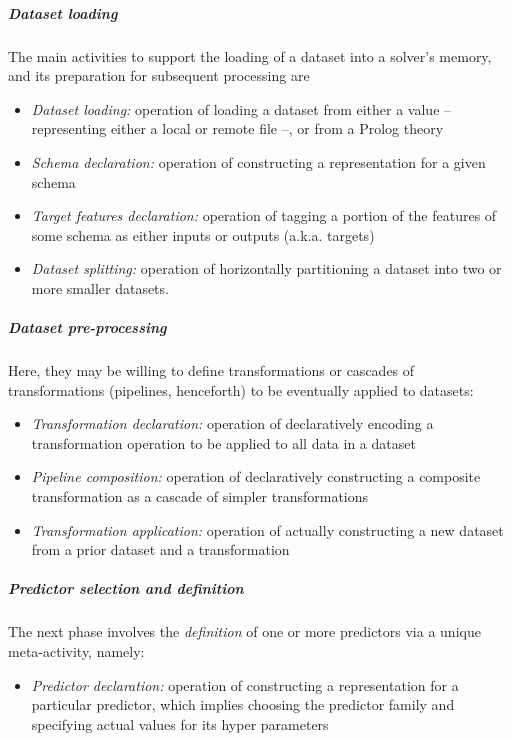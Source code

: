 \documentclass[runningheads]{llncs}
\begin{document}

\subparagraph{Dataset loading}
%
The main activities to support the loading of a dataset into a solver's memory, and its preparation for subsequent processing are
%
\begin{itemize}
    \item \emph{Dataset loading:} operation of loading a dataset from either a value -- representing either a local or remote file --, or from a Prolog theory
    \item \emph{Schema declaration:}  operation of constructing a representation for a given schema
    \item \emph{Target features declaration:} operation of tagging a portion of the features of some schema as either inputs or outputs (a.k.a. targets)
    \item \emph{Dataset splitting:} operation of horizontally partitioning a dataset into two or more smaller datasets.
\end{itemize}

\subparagraph{Dataset pre-processing}
%
Here, they may be willing to define transformations or cascades of transformations (pipelines, henceforth) to be eventually applied to datasets:
%
\begin{itemize}
    \item \emph{Transformation declaration:} operation of declaratively encoding a transformation operation to be applied to all data in a dataset
    \item \emph{Pipeline composition:} operation of declaratively constructing a composite transformation as a cascade of simpler transformations
    \item \emph{Transformation application:} operation of actually constructing a new dataset from a prior dataset and a transformation
\end{itemize}

\subparagraph{Predictor selection and definition}
%
The next phase involves the \emph{definition} of one or more predictors via a unique meta-activity, namely:
%
\begin{itemize}
    \item \emph{Predictor declaration:} operation of constructing a representation for a particular predictor, which implies choosing the predictor family and specifying actual values for its hyper parameters
\end{itemize}
\end{document}
